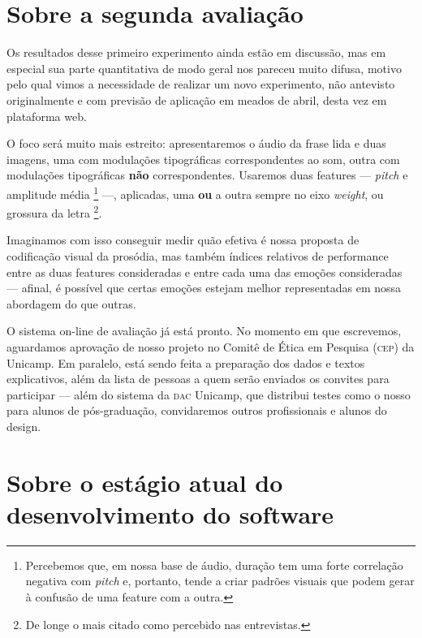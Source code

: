 \documentclass[a4paper,11pt,titlepage,singlespacing]{article}
\let\svthefootnote\thefootnote
\newcommand\Cfootnote[2][black]{\def\thefootnote{\color{#1}\svthefootnote}%
  \footnote{\color{#1}#2}}
\begin{document}
{    \section{Sobre a segunda avaliação}
    \label{sec:n_avaliacao_2}

    Os resultados desse primeiro experimento ainda estão em discussão, mas em especial sua parte quantitativa de modo geral nos pareceu muito difusa, motivo pelo qual vimos a necessidade de realizar um novo experimento, não antevisto originalmente e com previsão de aplicação em meados de abril, desta vez em plataforma web. 
    
    O foco será muito mais estreito: apresentaremos o áudio da frase lida e duas imagens, uma com modulações tipográficas correspondentes ao som, outra com modulações tipográficas \textbf{não} correspondentes. Usaremos duas features — \textit{pitch} e amplitude média\Cfootnote[pos_parecer]{Percebemos que, em nossa base de áudio, duração tem uma forte correlação negativa com \textit{pitch} e, portanto, tende a criar padrões visuais que podem gerar à confusão de uma feature com a outra.} —, aplicadas, uma \textbf{ou} a outra sempre no eixo \textit{weight}, ou grossura da letra\Cfootnote[pos_parecer]{De longe o mais citado como percebido nas entrevistas.}. 
    
    Imaginamos com isso conseguir medir quão efetiva é nossa proposta de codificação visual da prosódia, mas também índices relativos de performance entre as duas features consideradas e entre cada uma das emoções consideradas — afinal, é possível que certas emoções estejam melhor representadas em nossa abordagem do que outras.
    
    O sistema on-line de avaliação já está pronto. No momento em que escrevemos, aguardamos aprovação de nosso projeto no Comitê de Ética em Pesquisa (\textsc{cep}) da Unicamp. Em paralelo, está sendo feita a preparação dos dados e textos explicativos, além da lista de pessoas a quem serão enviados os convites para participar — além do sistema da \textsc{dac} Unicamp, que distribui testes como o nosso para alunos de pós-graduação, convidaremos outros profissionais e alunos do design.



    \section{Sobre o estágio atual do desenvolvimento do software}
    \label{sec:n_estagio_atual_software}
    
}
\end{document}
